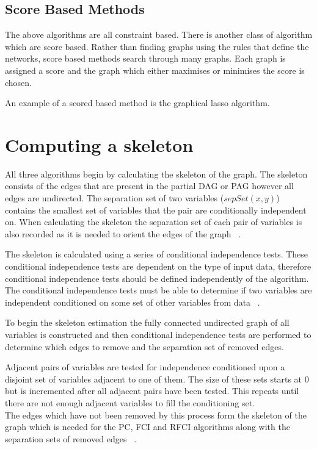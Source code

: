 \documentclass{UoYCSproject}
\begin{document}
\subsection{Score Based Methods}
The above algorithms are all constraint based. There is another class of algorithm which are score based. Rather than finding graphs using the rules that define the networks, score based methods search through many graphs. Each graph is assigned a score and the graph which either maximises or minimises the score is chosen.

An example of a scored based method is the graphical lasso algorithm. 

\section{Computing a skeleton}
All three algorithms begin by calculating the skeleton of the graph. The skeleton consists of the edges that are present in the partial DAG or PAG however all edges are undirected. The separation set of two variables ($sepSet(x,y)$) contains the smallest set of variables that the pair are conditionally independent on. When calculating the skeleton the separation set of each pair of variables is also recorded as it is needed to orient the edges of the graph ~\parencite{colombo2012learning, spirtes1991algorithm}.

The skeleton is calculated using a series of conditional independence tests. These conditional independence tests are dependent on the type of input data, therefore conditional independence tests should be defined independently of the algorithm. The conditional independence tests must be able to determine if two variables are independent conditioned on some set of other variables from data ~\parencite{spirtes1991algorithm}.

To begin the skeleton estimation the fully connected undirected graph of all variables is constructed and then conditional independence tests are performed to determine which edges to remove and the separation set of removed edges.

Adjacent pairs of variables are tested for independence conditioned upon a disjoint set of variables adjacent to one of them. The size of these sets starts at 0 but is incremented after all adjacent pairs have been tested. This repeats until there are not enough adjacent variables to fill the conditioning set.\\

The edges which have not been removed by this process form the skeleton of the graph which is needed for the PC, FCI and RFCI algorithms along with the separation sets of removed edges  ~\parencite{spirtes1991algorithm, colombo2012learning}.
\end{document}
